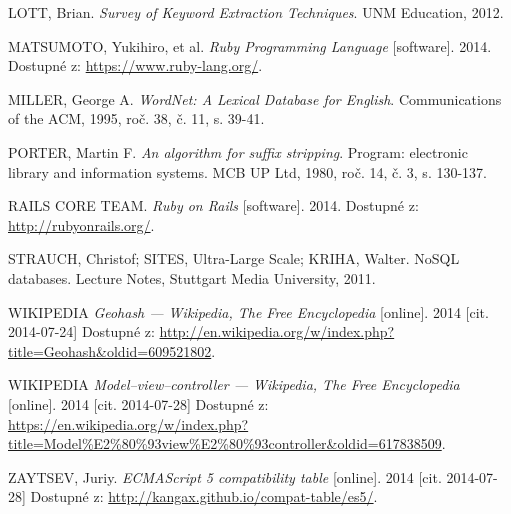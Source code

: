 \begin{thebibliography}{99}
  LOTT, Brian. \textit{Survey of Keyword Extraction Techniques}. UNM Education, 2012.

  MATSUMOTO, Yukihiro, et al. \textit{Ruby Programming Language} [software]. 2014.
  Dostupné z: \url{https://www.ruby-lang.org/}.

  MILLER, George A.
  \emph{WordNet: A Lexical Database for English}.
  Communications of the ACM, 1995, roč. 38, č. 11, s. 39-41.

  PORTER, Martin F.
  \emph{An algorithm for suffix stripping}.
  Program: electronic library and information systems. MCB UP Ltd, 1980, roč. 14, č. 3, s. 130-137.

  RAILS CORE TEAM. \textit{Ruby on Rails} [software]. 2014.
  Dostupné z: \url{http://rubyonrails.org/}.

  STRAUCH, Christof; SITES, Ultra-Large Scale; KRIHA, Walter. NoSQL databases. Lecture Notes, Stuttgart Media University, 2011.

  WIKIPEDIA
  \emph{Geohash --- Wikipedia{,} The Free Encyclopedia} [online]. 2014 [cit. 2014-07-24]
  Dostupné z: \url{http://en.wikipedia.org/w/index.php?title=Geohash&oldid=609521802}.

  WIKIPEDIA
  \emph{Model–view–controller --- Wikipedia{,} The Free Encyclopedia} [online]. 2014 [cit. 2014-07-28]
  Dostupné z: \url{https://en.wikipedia.org/w/index.php?title=Model%E2%80%93view%E2%80%93controller&oldid=617838509}.

  ZAYTSEV, Juriy. \textit{ECMAScript 5 compatibility table} [online]. 2014 [cit. 2014-07-28]
  Dostupné z: \url{http://kangax.github.io/compat-table/es5/}.


\end{thebibliography}



